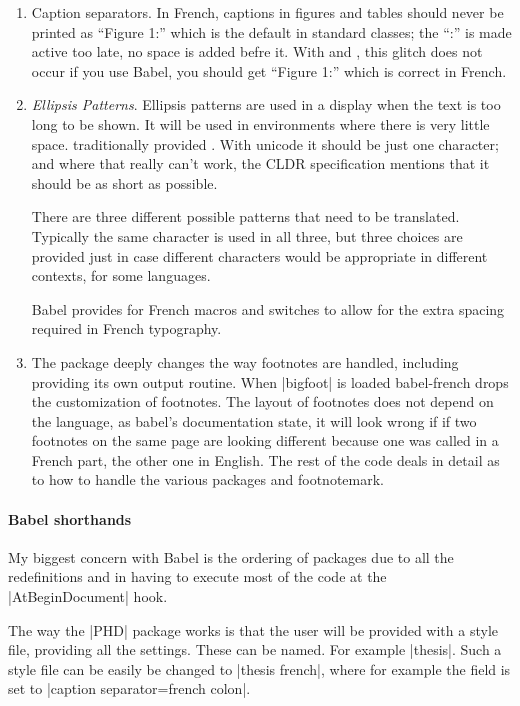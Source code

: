 \begin{enumerate}
       \item Caption separators. In French, captions in figures and tables should never be printed as \enquote{Figure 1:} which is the default in standard \latexe classes; the \enquote{:} is made active too late, no space is added befre it. With \lualatex and \xelatex, this glitch does not occur if you use Babel, you should get \enquote{Figure 1\thinspace:} which is correct in French. 
       \item \textit{Ellipsis Patterns}.  Ellipsis patterns are used in a display when the text is too long to be shown. It will be used in environments where there is very little space. \tex traditionally provided . With unicode it should be just one character; and where that really can't work, the CLDR specification mentions that it should be as short as possible. 

There are three different possible patterns that need to be translated. Typically the same character is used in all three, but three choices are provided just in case different characters would be appropriate in different contexts, for some languages.

       Babel provides for French macros and switches to allow for the extra spacing required in French typography.

       \item The  package deeply changes the way footnotes are handled, including providing its own output routine. When |bigfoot| is loaded babel-french drops the customization of footnotes. The layout of footnotes does not depend on the language, as babel's documentation state, it will look wrong if if two footnotes on the same page are looking different because one was called in a French part, the other one in English.  The rest of the code deals in detail as to how to handle the various
       packages and footnotemark.  
     \end{enumerate}
   
   
\paragraph{Babel shorthands}      
My biggest concern with Babel is the ordering of packages due to all the redefinitions and in having to execute most of the code at the |AtBeginDocument| hook.      
    
The way the |PHD| package works is that the user will be provided with a style file, providing all the settings. These can be named. For example |thesis|. Such a style file can be easily be changed to |thesis french|, where for example the field  is set to |caption separator=french colon|.     

